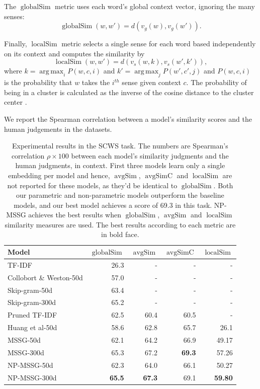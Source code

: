 \documentclass[11pt,a4paper]{article}
\DeclareMathOperator*{\argmax}{arg\,max}
\DeclareMathOperator*{\avgSim}{avgSim}
\DeclareMathOperator*{\avgSimC}{avgSimC}
\DeclareMathOperator*{\globalSim}{globalSim}
\DeclareMathOperator*{\localSim}{localSim}
\begin{document}
The $\globalSim$ metric uses each word's global context
vector, ignoring the many senses:
\begin{dmath*}
\globalSim(w, w') = 
    d\left(v_g(w), v_g(w')\right).
\end{dmath*}

Finally, $\localSim$ metric selects a single sense for each word based
independently on its context and computes the similarity by
\begin{dmath*}
\localSim(w, w') = 
  d\left(v_s(w, k), v_s(w', k')\right),
\end{dmath*}
where $k = \argmax_{i} P(w, c, i)$ and $k' = \argmax_{j} P(w', c', j)$ and $P(w, c, i)$ is the probability that $w$ takes the $i^{th}$ sense given context $c$. The probability of being in a cluster is calculated as the inverse of the cosine distance to the cluster center \cite{huang:2012}.

We report the Spearman correlation between a model's similarity scores
and the human judgements in the datasets.


\begin{table}[t!]
\centering
\begin{tabular}{ |l|r|r|r|r| }
\hline
Model & $\globalSim$ & $\avgSim$ & $\avgSimC$ & $\localSim$ \\  \hline \hline
TF-IDF                        & 26.3 & - & - & - \\ \hline
Collobort \& Weston-50d       & 57.0  & - & - & -   \\ \hline
Skip-gram-50d            &  63.4     & - & -  & - \\ \hline
Skip-gram-300d           &  65.2 & - & - & - \\ \hline
\hline
Pruned TF-IDF                 & 62.5 & 60.4 & 60.5 & -   \\ \hline
Huang et al-50d               & 58.6 & 62.8 & 65.7 & 26.1 \\ \hline
MSSG-50d          & 62.1 & 64.2 & 66.9 &  49.17 \\ \hline 
MSSG-300d     & 65.3 & 67.2 & \textbf{69.3} & 57.26 \\ \hline
NP-MSSG-50d    & 62.3 & 64.0 & 66.1 & 50.27 \\ \hline 
NP-MSSG-300d & \textbf{65.5} & \textbf{67.3} & 69.1 & \textbf{59.80}   \\ \hline 
\end{tabular}
\caption{Experimental results in the SCWS task. The numbers are Spearman’s correlation $\rho \times 100$ between each model's similarity judgments and the human judgments, in context. First three models learn only a single embedding per model and hence, $\avgSim$, $\avgSimC$ and $\localSim$ are not reported for these models, as they'd be identical to $\globalSim$. Both our parametric and non-parametric models outperform the baseline models, and our best model achieves a score of 69.3 in this task. NP-MSSG achieves the best results when $\globalSim$, $\avgSim$ and $\localSim$ similarity measures are used. The best results according to each metric are in bold face.}
\label{table:scws-task}
\end{table}
\end{document}
